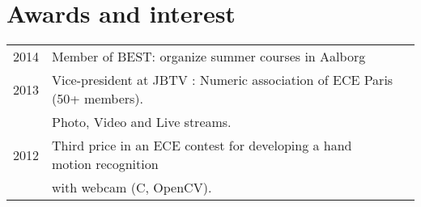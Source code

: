 \documentclass[letterpaper]{deedy-resume} %
\begin{document}
\begin{minipage}[t]{0.66\textwidth}
\sectionspace %


\section{Awards and interest} 

\begin{tabular}{rll}
2014	& Member of BEST: organize summer courses in Aalborg\\
2013	& Vice-president at JBTV : Numeric association of ECE Paris (50+ members).\\ 
		& Photo, Video and Live streams.\\
2012	& Third price in an ECE contest for developing a hand motion recognition\\
		& with webcam (C, OpenCV).\\
\end{tabular} 



\sectionspace %


\end{minipage} %








\end{document}
